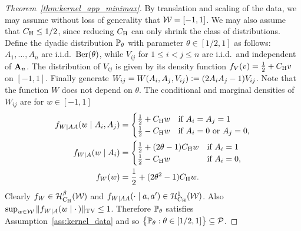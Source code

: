 \begin{proof}[Theorem~\ref{thm:kernel_app_minimax}]


  By translation and scaling of the data,
  we may assume without loss of generality that $\cW = [-1,1]$.
  We may also assume that $\CH \leq 1/2$,
  since reducing $\CH$ can only shrink the class of distributions.
  Define the dyadic distribution $\P_\theta$
  with parameter $\theta \in [1/2, 1]$
  as follows:
  $A_1, \ldots, A_n$ are i.i.d.\ $\Ber(\theta)$, while
  $V_{ij}$ for $1 \leq i < j \leq n$ are i.i.d.\
  and independent of $\bA_n$.
  The distribution of $V_{ij}$ is given by its density function
  $f_V(v) = \frac{1}{2} + \CH v$ on $[-1,1]$.
  Finally generate
  $W_{ij} = W(A_i, A_j, V_{ij}) \vcentcolon=
  (2 A_i A_j - 1) V_{ij}$.
  Note that the function $W$ does not depend on $\theta$.
  The conditional and marginal densities of $W_{ij}$ are
  for $w \in [-1,1]$
  \begin{align*}
    f_{W \mid AA}(w \mid A_i, A_j)
    &=
    \begin{cases}
      \frac{1}{2} + \CH w & \text{if } A_i = A_j = 1                \\
      \frac{1}{2} - \CH w & \text{if } A_i = 0 \text{ or } A_j = 0, \\
    \end{cases} \\
    f_{W \mid A}(w \mid A_i)
    &=
    \begin{cases}
      \frac{1}{2} + (2 \theta - 1) \CH w
      & \text{if } A_i = 1   \\
      \frac{1}{2} - \CH w & \text{if } A_i = 0 , \\
    \end{cases} \\
    f_W(w)&= \frac{1}{2} + (2\theta^2 - 1) \CH w.
  \end{align*}
  Clearly
  $f_W \in \cH^\beta_{\CH}(\cW)$ and
  $f_{W \mid AA}(\cdot \mid a, a') \in \cH^1_{\CH}(\cW)$.
  Also
  $\sup_{w \in \cW} \|f_{W \mid A}(w \mid \cdot\,)\|_\TV \leq 1$.
  Therefore
  $\P_\theta$ satisfies Assumption~\ref{ass:kernel_data}
  and so
  $\big\{\P_\theta : \theta \in [1/2, 1] \big\} \subseteq \cP$.


\end{proof}
